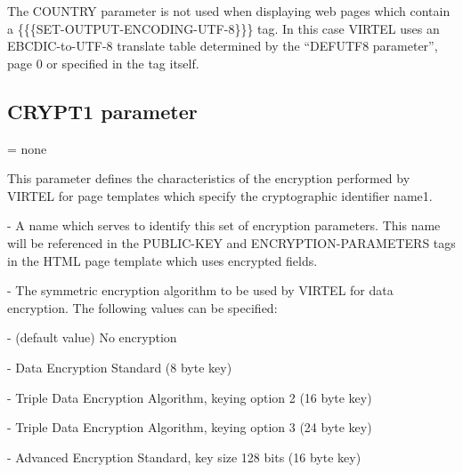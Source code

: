 \documentclass[letterpaper,10pt,english]{sphinxmanual}
\begin{document}
The COUNTRY parameter is not used when displaying web pages which contain a \{\{\{SET-OUTPUT-ENCODING-UTF-8\}\}\} tag. In this case VIRTEL uses an EBCDIC-to-UTF-8 translate table determined by the “DEFUTF8 parameter”, page 0 or specified in the tag itself.

\ignorespaces 

\subsection{CRYPT1 parameter}
\label{\detokenize{Installation_Guide:crypt1-parameter}}\label{\detokenize{Installation_Guide:index-49}}
\begin{sphinxVerbatim}[commandchars=\\\{\}]
\PYG{p}{[}\PYG{p}{]}\PYG{p}{[}\PYG{p}{]}\PYG{p}{[}\PYG{p}{]}\PYG{p}{[}\PYG{p}{]}\PYG{p}{[}\PYG{p}{]}\PYG{p}{[}\PYG{p}{]}
\end{sphinxVerbatim}

 = none

This parameter defines the characteristics of the encryption performed by VIRTEL for page templates which specify the cryptographic identifier name1.

 - A name which serves to identify this set of encryption parameters. This name will be referenced in the PUBLIC-KEY and ENCRYPTION-PARAMETERS tags in the HTML page template which uses encrypted fields.

 - The symmetric encryption algorithm to be used by VIRTEL for data encryption. The following values can be specified:

 - (default value) No encryption

 - Data Encryption Standard (8 byte key)

 - Triple Data Encryption Algorithm, keying option 2 (16 byte key)

 - Triple Data Encryption Algorithm, keying option 3 (24 byte key)

 - Advanced Encryption Standard, key size 128 bits (16 byte key)
\end{document}
